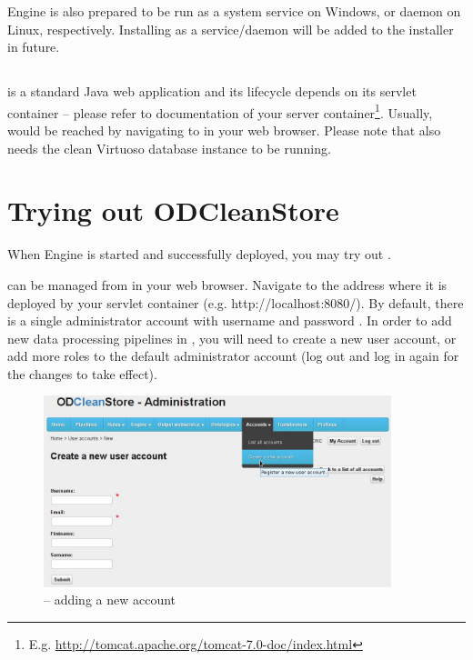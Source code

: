 Engine is also prepared to be run as a system service on Windows, or daemon on Linux, respectively. Installing \odcs as a service/daemon will be added to the installer in future.

\section{\FE}
\FE is a standard Java web application and its lifecycle depends on its servlet container -- please refer to documentation of your server container\footnote{E.g. \url{http://tomcat.apache.org/tomcat-7.0-doc/index.html}}. Usually, \FE would be reached by navigating to  in your web browser. Please note that \FE also needs the clean Virtuoso database instance to be running.

\chapter{Trying out ODCleanStore}
When Engine is started and \FE successfully deployed, you may try out \odcs.

\odcs can be managed from \FE in your web browser. Navigate to the address where it is deployed by your servlet container (e.g. http://localhost:8080/). By default, there is a single administrator account with username  and password . In order to add new data processing pipelines in \FE, you will need to create a new user account, or add more roles to the default administrator account (log out and log in again for the changes to take effect).

\begin{figure}[htb]
    \centering
    \includegraphics[width=0.9\textwidth]{images/fe-new-account.png}
    \caption{\FE -- adding a new account}
\end{figure}

